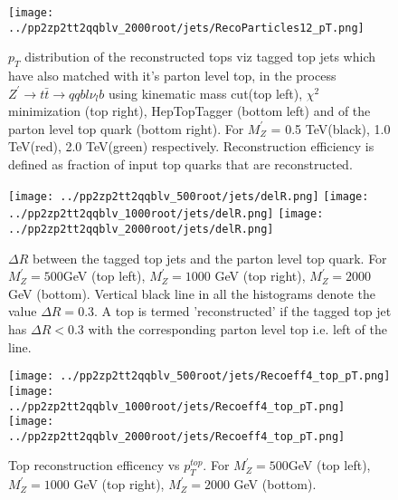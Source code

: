 \documentclass[12pt,a4paper]{article}		%
\begin{document}
\begin{figure}[h]
	\begin{centering}	
		\texttt{[image: ../pp2zp2tt2qqblv\_2000root/jets/RecoParticles12\_pT.png]} 
		\caption{ $p_T$ distribution of the reconstructed tops viz tagged top jets which have also matched with it's parton level top, in the process  $Z^\prime \to t \bar{t} \to qqbl\nu_{l}b$ using kinematic mass cut(top left), $\chi^2$ minimization (top right), HepTopTagger (bottom left) and of the parton level top quark (bottom right). For $M_Z^\prime$ = 0.5 TeV(black), 1.0 TeV(red), 2.0 TeV(green)  respectively. Reconstruction efficiency is defined as fraction of input top quarks that are reconstructed. }
		\label{toppt}
		\centering
	\end{centering} 		
\end{figure}   
\newpage

\begin{figure}[h]
	\begin{centering}	
		\texttt{[image: ../pp2zp2tt2qqblv\_500root/jets/delR.png]} 
		\texttt{[image: ../pp2zp2tt2qqblv\_1000root/jets/delR.png]} 
		\texttt{[image: ../pp2zp2tt2qqblv\_2000root/jets/delR.png]}
		\caption{ $\Delta R$ between the tagged top jets and the parton level top quark. For $M_Z^\prime = 500$GeV (top left), $M_Z^\prime = 1000$ GeV (top right), $M_Z^\prime = 2000$ GeV (bottom). Vertical black line in all the histograms denote the value $\Delta R = 0.3$. A top is termed 'reconstructed' if the tagged top jet has $\Delta R < 0.3$  with the corresponding parton level top i.e. left of the line.}
		\label{delR}
		\centering
	\end{centering} 		
\end{figure}   

\begin{figure}[h]
	\begin{centering}	
		\texttt{[image: ../pp2zp2tt2qqblv\_500root/jets/Recoeff4\_top\_pT.png]} 
		\texttt{[image: ../pp2zp2tt2qqblv\_1000root/jets/Recoeff4\_top\_pT.png]} 
		\texttt{[image: ../pp2zp2tt2qqblv\_2000root/jets/Recoeff4\_top\_pT.png]}
		\caption{Top reconstruction efficency vs $p_T^{top}$. For $M_Z^\prime = 500$GeV (top left), $M_Z^\prime = 1000$ GeV (top right), $M_Z^\prime = 2000$ GeV (bottom).  }
		\label{recoeff_vs_pt}
		\centering
	\end{centering} 		
\end{figure}   
\end{document}
